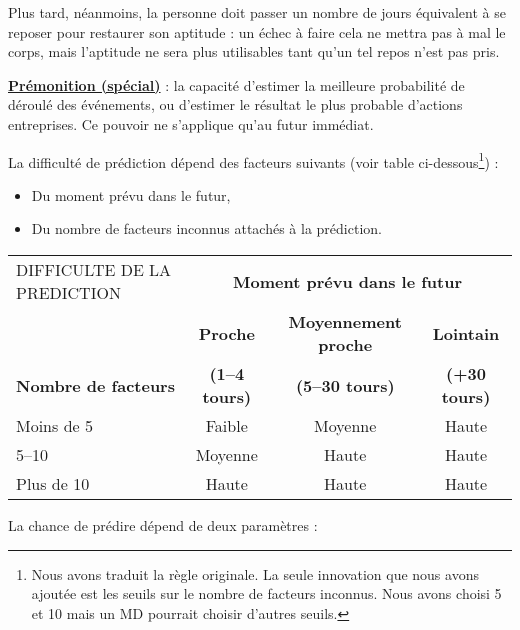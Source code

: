 \bigskip

Plus tard, néanmoins, la personne doit passer un nombre de jours équivalent à se reposer pour restaurer son aptitude : un échec à faire cela ne mettra pas à mal le corps, mais l'aptitude ne sera plus utilisables tant qu'un tel repos n'est pas pris.

\bigskip

\label{guerrier-premonition}\textbf{\uline{Prémonition (spécial)}} : la capacité d'estimer la meilleure probabilité de déroulé des événements, ou d'estimer le résultat le plus probable d'actions entreprises. Ce pouvoir ne s'applique qu'au futur immédiat.

\bigskip

La difficulté de prédiction dépend des facteurs suivants (voir table ci-dessous\footnote{Nous avons traduit la règle originale. La seule innovation que nous avons ajoutée est les seuils sur le nombre de facteurs inconnus. Nous avons choisi 5 et 10 mais un MD pourrait choisir d'autres seuils.}) :

\bigskip

\begin{itemize}
\item Du moment prévu dans le futur,
\item Du nombre de facteurs inconnus attachés à la prédiction.
\end{itemize}

\bigskip

\begin{tabular}{lccc}
DIFFICULTE DE LA PREDICTION & \multicolumn{3}{c}{\textbf{Moment prévu dans le futur}} \\
                    & \textbf{Proche}        & \textbf{Moyennement proche}    & \textbf{Lointain}  \\
\textbf{Nombre de facteurs}  & \textbf{(1--4 tours)}  & \textbf{(5--30 tours) }  & \textbf{(+30 tours)} \\
Moins de 5          & Faible        & Moyenne               & Haute \\
5--10               & Moyenne       & Haute                 & Haute \\
Plus de 10          & Haute         & Haute                 & Haute \\
\end{tabular}

\bigskip

La chance de prédire dépend de deux paramètres :

\bigskip

